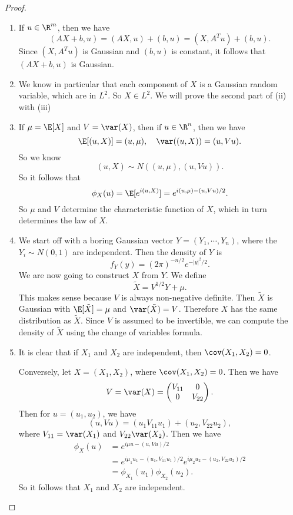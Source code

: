 \documentclass[a4paper]{article}
\begin{document}
\begin{proof}\leavevmode
  \begin{enumerate}
    \item If $u \in \R^m$, then we have
      \[
        (AX + b, u) = (AX, u) + (b, u) = (X, A^T u) + (b, u).
      \]
      Since $(X, A^T u)$ is Gaussian and $(b, u)$ is constant, it follows that $(AX + b, u)$ is Gaussian.
    \item We know in particular that each component of $X$ is a Gaussian random variable, which are in $L^2$. So $X \in L^2$. We will prove the second part of (ii) with (iii)
    \item If $\mu = \E[X]$ and $V = \var(X)$, then if $u \in \R^n$, then we have
      \[
        \E[(u, X)] = (u, \mu),\quad \var((u, X)) = (u, Vu).
      \]
      So we know
      \[
        (u, X) \sim N((u, \mu), (u, Vu)).
      \]
      So it follows that
      \[
        \phi_X(u) = \E[e^{i(u, X)}] = e^{i(u, \mu) - (u, Vu)/2}.
      \]
      So $\mu$ and $V$ determine the characteristic function of $X$, which in turn determines the law of $X$.
    \item We start off with a boring Gaussian vector $Y = (Y_1, \cdots, Y_n)$, where the $Y_i \sim N(0, 1)$ are independent. Then the density of $Y$ is
      \[
        f_Y(y) = (2\pi)^{-n/2} e^{-|y|^2/2}.
      \]
      We are now going to construct $X$ from $Y$. We define
      \[
        \tilde{X} = V^{1/2} Y + \mu.
      \]
      This makes sense because $V$ is always non-negative definite. Then $\tilde{X}$ is Gaussian with $\E[\tilde{X}] = \mu$ and $\var(\tilde{X}) = V$. Therefore $X$ has the same distribution as $\tilde{X}$. Since $V$ is assumed to be invertible, we can compute the density of $\tilde{X}$ using the change of variables formula.
    \item It is clear that if $X_1$ and $X_2$ are independent, then $\cov(X_1, X_2) = 0$.

      Conversely, let $X = (X_1, X_2)$, where $\cov(X_1, X_2) = 0$. Then we have
      \[
        V = \var(X) =
        \begin{pmatrix}
          V_{11} & 0\\
          0 & V_{22}
        \end{pmatrix}.
      \]
      Then for $u = (u_1, u_2)$, we have
      \[
        (u, Vu) = (u_1 V_{11} u_1) + (u_2, V_{22}u_2),
      \]
      where $V_{11} = \var(X_1)$ and $V_{22} \var(X_2)$. Then we have
      \begin{align*}
        \phi_X(u) &= e^{i\mu u - (u, Vu)/2}\\
        &= e^{i\mu_1 u_1 - (u_1, V_{11}u_1)/2} e^{i\mu_2 u_2 - (u_2, V_{22}u_2)/2}\\
        &= \phi_{X_1}(u_1)\phi_{X_2} (u_2).
      \end{align*}
      So it follows that $X_1$ and $X_2$ are independent.
  \end{enumerate}
\end{proof}
\end{document}
